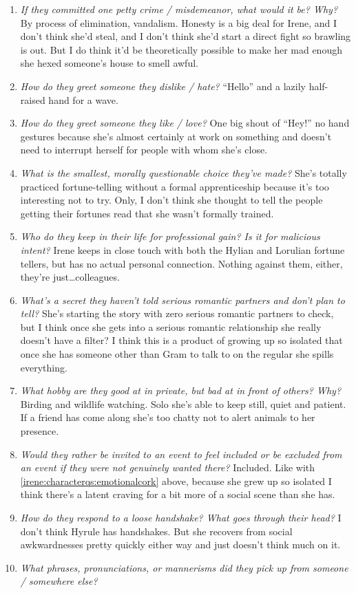 \begin{enumerate}
    \item \textit{If they committed one petty crime / misdemeanor, what would it be? Why?}
      By process of elimination, vandalism. Honesty is a big deal for Irene, and I don't think she'd steal, and I don't think she'd start a direct fight so brawling is out. But I do think it'd be theoretically possible to make her mad enough she hexed someone's house to smell awful. 
    \item \textit{How do they greet someone they dislike / hate?}
      ``Hello'' and a lazily half-raised hand for a wave.
    \item \textit{How do they greet someone they like / love?}
      One big shout of ``Hey!'' no hand gestures because she's almost certainly at work on something and doesn't need to interrupt herself for people with whom she's close.
    \item \textit{What is the smallest, morally questionable choice they’ve made?}
      She's totally practiced fortune-telling without a formal apprenticeship because it's too interesting not to try. Only, I don't think she thought to tell the people getting their fortunes read that she wasn't formally trained.
    \item \textit{Who do they keep in their life for professional gain? Is it for malicious intent?}
      Irene keeps in close touch with both the Hylian and Lorulian fortune tellers, but has no actual personal connection. Nothing against them, either, they're just\ldots colleagues. 
    \item \textit{What’s a secret they haven’t told serious romantic partners and don’t plan to tell?}\label{irene:characterqs:emotionalcork}
      She's starting the story with zero serious romantic partners to check, but I think once she gets into a serious romantic relationship she really doesn't have a filter? I think this is a product of growing up so isolated that once she has someone other than Gram to talk to on the regular she spills everything.
    \item \textit{What hobby are they good at in private, but bad at in front of others? Why?}
      Birding and wildlife watching. Solo she's able to keep still, quiet and patient. If a friend has come along she's too chatty not to alert animals to her presence.
    \item \textit{Would they rather be invited to an event to feel included or be excluded from an event if they were not genuinely wanted there?}
      Included. Like with \ref{irene:characterqs:emotionalcork} above, because she grew up so isolated I think there's a latent craving for a bit more of a social scene than she has.
    \item \textit{How do they respond to a loose handshake? What goes through their head?}
      I don't think Hyrule has handshakes. But she recovers from social awkwardnesses pretty quickly either way and just doesn't think much on it.
    \item \textit{What phrases, pronunciations, or mannerisms did they pick up from someone / somewhere else?}
    

\end{enumerate}
